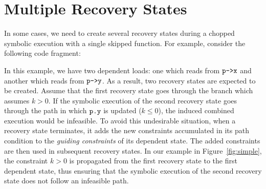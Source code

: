 
\section{Multiple Recovery States}
\label{Se:MultiRecovery}
In some cases, we need to create several recovery states during a
chopped symbolic execution with a single skipped function.
For example, consider the following code fragment:


\label{fig:ret2void-original-f}

In this example, we have two dependent loads:
one which reads from $\texttt{p->x}$ and another which reads from $\texttt{p->y}$.
As a result, two recovery states are expected to be created.
Assume that the first recovery state goes through the branch which assumes $k > 0$.
If the symbolic execution of the second recovery state goes through the path in which
$\texttt{p.y}$ is updated ($k\le0$), the induced combined execution
would be infeasible. To avoid this undesirable situation, when a
recovery state terminates, it adds the new constraints accumulated in
its path condition to the \textit{guiding constraints} of its dependent state. The added
constraints are then used in subsequent recovery states. In our
example in Figure~\ref{fig:simple}, the constraint $k > 0$ is
propagated from the first recovery state to the first dependent state,
thus ensuring that the symbolic execution of the second recovery state
does not follow an infeasible path.

